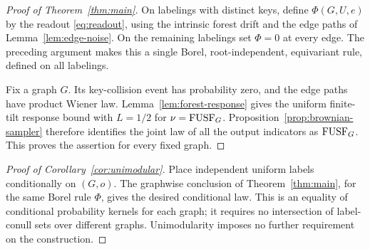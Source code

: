 \begin{proof}[Proof of Theorem~\ref{thm:main}]
On labelings with distinct keys, define $\Phi(G,U,e)$ by the readout
\eqref{eq:readout}, using the intrinsic forest drift and the edge paths of
Lemma~\ref{lem:edge-noise}. On the remaining labelings set $\Phi=0$ at every
edge. The preceding argument makes this a single Borel, root-independent,
equivariant rule, defined on all labelings.

Fix a graph $G$. Its key-collision event has probability zero, and the edge
paths have product Wiener law. Lemma~\ref{lem:forest-response} gives the
uniform finite-tilt response bound with $L=1/2$ for $\nu=\mathrm{FUSF}_G$.
Proposition~\ref{prop:brownian-sampler} therefore identifies the joint law
of all the output indicators as $\mathrm{FUSF}_G$. This proves the assertion for
every fixed graph.
\end{proof}

\begin{proof}[Proof of Corollary~\ref{cor:unimodular}]
Place independent uniform labels conditionally on $(G,o)$. The graphwise
conclusion of Theorem~\ref{thm:main}, for the same Borel rule $\Phi$, gives
the desired conditional law. This is an equality of conditional probability
kernels for each graph; it requires no intersection of label-conull sets
over different graphs. Unimodularity imposes no further requirement on the
construction.
\end{proof}
